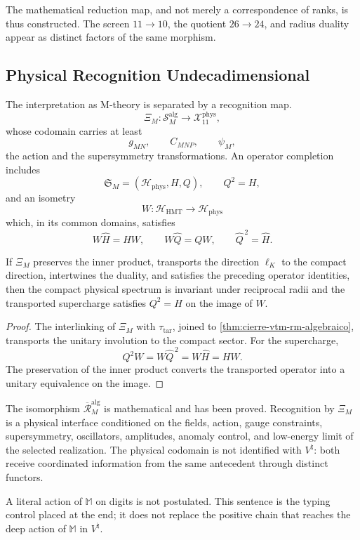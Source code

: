 The mathematical reduction map, and not merely a
correspondence of ranks, is thus constructed. The screen \(11\to10\), the quotient
\(26\to24\), and radius duality appear as distinct factors of the
same morphism.

\subsection{Physical Recognition Undecadimensional}

The interpretation as M-theory is separated by a recognition map.
\[
 \Xi_M:\mathscr S_M^{\mathrm{alg}}
 \longrightarrow\mathcal X_{11}^{\mathrm{phys}},
\]
whose codomain carries at least
\[
 g_{MN},\qquad C_{MNP},\qquad\psi_M,
\]
the action and the supersymmetry transformations. An operator completion includes
\[
 \mathfrak S_M=(\mathcal H_{\mathrm{phys}},H,Q),
 \qquad Q^2=H,
\]
and an isometry
\[
 W:\mathcal H_{\mathrm{HMT}}\longrightarrow\mathcal H_{\mathrm{phys}}
\]
which, in its common domains, satisfies
\[
 W\widehat H=HW,
 \qquad W\widehat Q=QW,
 \qquad \widehat Q^{\,2}=\widehat H.
\]

\begin{theorem}
\label{thm:cierre-vtm-reconocimiento-fisico-m}
If \(\Xi_M\) preserves the inner product, transports the direction \(\ell_K\) to the compact direction, intertwines the duality, and satisfies the preceding operator identities, then the compact physical spectrum is invariant under reciprocal radii and the transported supercharge satisfies \(Q^2=H\) on the image of \(W\).
\end{theorem}

\begin{proof}
The interlinking of \(\Xi_M\) with \(\tau_{\mathrm{tar}}\), joined to
\cref{thm:cierre-vtm-rm-algebraico}, transports the unitary involution to the
compact sector. For the supercharge,
\[
 Q^2W=W\widehat Q^{\,2}=W\widehat H=HW.
\]
The preservation of the inner product converts the transported operator into a unitary equivalence on the image.
\end{proof}

The isomorphism
\(\overline{\mathcal R}_M^{\mathrm{alg}}\) is mathematical and has been proved.
Recognition by \(\Xi_M\) is a physical interface conditioned on the
fields, action, gauge constraints, supersymmetry,
oscillators, amplitudes, anomaly control, and low-energy limit of the selected
realization. The physical codomain is not identified with
\(V^\natural\): both receive coordinated information from the same antecedent
through distinct functors.

A literal action of \(\mathbb M\) on digits is not postulated. This sentence is
the typing control placed at the end; it does not replace the positive chain that
reaches the deep action of \(\mathbb M\) in \(V^\natural\).
